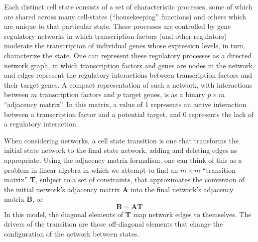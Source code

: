 Each distinct cell state consists of a set of characteristic processes, some of which are shared across many cell-states (``housekeeping'' functions) and others which are unique to that particular state. These processes are controlled by gene regulatory networks in which transcription factors (and other regulators) moderate the transcription of individual genes whose expression levels, in turn, characterize the state. One can represent these regulatory processes as a directed network graph, in which transcription factors and genes are nodes in the network, and edges represent the regulatory interactions between transcription factors and their target genes. A compact representation of such a network, with interactions between $m$ transcription factors and $p$ target genes, is as a binary $p\times m$ ``adjacency matrix''. In this matrix, a value of 1 represents an active interaction between a transcription factor and a potential target, and 0 represents the lack of a regulatory interaction. 

When considering networks, a cell state transition is one that transforms the initial state network to the final state network, adding and deleting edges as appropriate. Using the adjacency matrix formalism, one can think of this as a problem in linear algebra in which we attempt to find an $m\times m$ ``transition matrix'' \textbf{T}, subject to a set of constraints, that approximates the conversion of the initial network\textquoteright s adjacency matrix \textbf{A} into the final network's adjacency matrix \textbf{B}, or 
\begin{equation}
\mathbf{B=AT}\label{eq: B=00003DAT}
\end{equation}
In this model, the diagonal elements of \textbf{T} map network edges to themselves. The drivers of the transition are those off-diagonal elements that change the configuration of the network between states.

